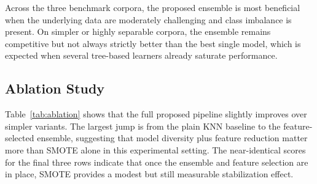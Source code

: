 \documentclass[conference]{IEEEtran}
\begin{document}
\begin{table}[htbp]
\caption{Binary Classification Results on CIC-IDS-2018.}
\label{tab:cic2018}
\centering
{}
\end{table}

Across the three benchmark corpora, the proposed ensemble is most beneficial when the underlying data are moderately challenging and class imbalance is present. On simpler or highly separable corpora, the ensemble remains competitive but not always strictly better than the best single model, which is expected when several tree-based learners already saturate performance.

\subsection{Ablation Study}
Table~\ref{tab:ablation} shows that the full proposed pipeline slightly improves over simpler variants. The largest jump is from the plain KNN baseline to the feature-selected ensemble, suggesting that model diversity plus feature reduction matter more than SMOTE alone in this experimental setting. The near-identical scores for the final three rows indicate that once the ensemble and feature selection are in place, SMOTE provides a modest but still measurable stabilization effect.
\end{document}
